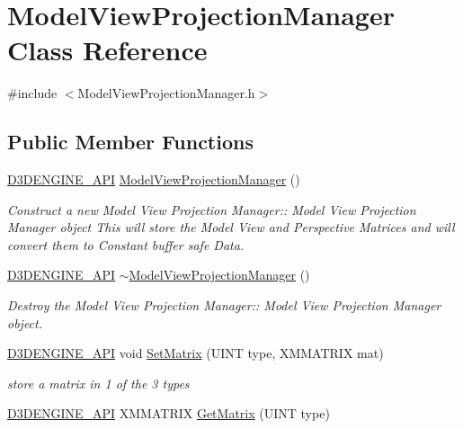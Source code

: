 \hypertarget{class_model_view_projection_manager}{}\section{Model\+View\+Projection\+Manager Class Reference}
\label{class_model_view_projection_manager}


{\ttfamily \#include $<$Model\+View\+Projection\+Manager.\+h$>$}

\subsection*{Public Member Functions}
\begin{DoxyCompactItemize}
\item 
\mbox{\hyperlink{stdafx_8h_a8ee2d990c5dfba7794dd2b60741d7722}{D3\+D\+E\+N\+G\+I\+N\+E\+\_\+\+A\+PI}} \mbox{\hyperlink{class_model_view_projection_manager_acf81b1fe0838094ca814ea3c8e5e3ba7}{Model\+View\+Projection\+Manager}} ()
\begin{DoxyCompactList}\small\item\em Construct a new Model View Projection Manager\+:\+: Model View Projection Manager object This will store the Model View and Perspective Matrices and will convert them to Constant buffer safe Data. \end{DoxyCompactList}\item 
\mbox{\hyperlink{stdafx_8h_a8ee2d990c5dfba7794dd2b60741d7722}{D3\+D\+E\+N\+G\+I\+N\+E\+\_\+\+A\+PI}} \mbox{\hyperlink{class_model_view_projection_manager_ae23209bae4e221dec901ea4fe79ba7ff}{$\sim$\+Model\+View\+Projection\+Manager}} ()
\begin{DoxyCompactList}\small\item\em Destroy the Model View Projection Manager\+:\+: Model View Projection Manager object. \end{DoxyCompactList}\item 
\mbox{\hyperlink{stdafx_8h_a8ee2d990c5dfba7794dd2b60741d7722}{D3\+D\+E\+N\+G\+I\+N\+E\+\_\+\+A\+PI}} void \mbox{\hyperlink{class_model_view_projection_manager_a924c97ae5988c33bd9585d3000d811e1}{Set\+Matrix}} (U\+I\+NT type, X\+M\+M\+A\+T\+R\+IX mat)
\begin{DoxyCompactList}\small\item\em store a matrix in 1 of the 3 types \end{DoxyCompactList}\item 
\mbox{\hyperlink{stdafx_8h_a8ee2d990c5dfba7794dd2b60741d7722}{D3\+D\+E\+N\+G\+I\+N\+E\+\_\+\+A\+PI}} X\+M\+M\+A\+T\+R\+IX \mbox{\hyperlink{class_model_view_projection_manager_a2ae680d4b31b2cb4775e91fc2dfbad70}{Get\+Matrix}} (U\+I\+NT type)

\end{DoxyCompactItemize}

